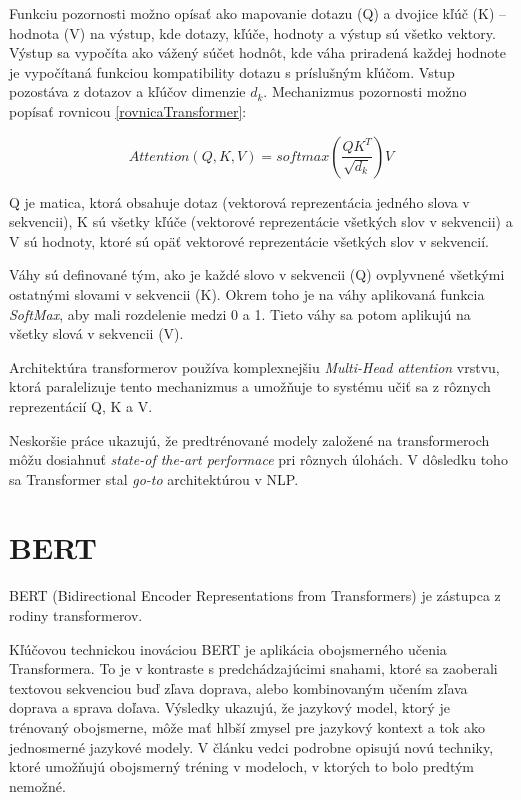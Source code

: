 Funkciu pozornosti možno opísať ako mapovanie dotazu (Q) a dvojice kľúč (K) – hodnota (V) na výstup, kde dotazy, kľúče, hodnoty a výstup sú všetko vektory. Výstup sa vypočíta ako vážený súčet hodnôt, kde váha priradená každej hodnote je vypočítaná funkciou kompatibility dotazu s príslušným kľúčom. Vstup pozostáva z dotazov a kľúčov dimenzie \(d_{k}\).
Mechanizmus pozornosti možno popísať rovnicou \eqref{rovnicaTransformer}: 

\begin{equation}
	Attention(Q, K, V)=  softmax(\dfrac{QK^{T}}{\sqrt{d_{k}}})V \label{rovnicaTransformer}
\end{equation}

Q je matica, ktorá obsahuje dotaz (vektorová reprezentácia jedného slova v sekvencii), K sú všetky kľúče (vektorové reprezentácie všetkých slov v sekvencii) a V sú hodnoty, ktoré sú opäť vektorové reprezentácie všetkých slov v sekvencií.

Váhy sú definované tým, ako je každé slovo v sekvencii (Q) ovplyvnené všetkými ostatnými slovami v sekvencii (K). Okrem toho je na váhy aplikovaná funkcia \textit{SoftMax}, aby mali rozdelenie medzi 0 a 1. Tieto váhy sa potom aplikujú na všetky slová v sekvencii (V).

Architektúra transformerov používa komplexnejšiu \textit{Multi-Head attention} vrstvu, ktorá paralelizuje tento mechanizmus a umožňuje to systému učiť sa z rôznych reprezentácií Q, K a V. 

Neskoršie práce ukazujú, že predtrénované modely založené na transformeroch môžu dosiahnuť \textit{state-of the-art performace} pri rôznych úlohách. V dôsledku toho sa Transformer stal \textit{go-to} architektúrou v NLP. \cite{Tianyang:2021} \cite{Allard:2019}

\section{BERT} \label{bert}

BERT \cite{Devlin:2018} (Bidirectional Encoder Representations from Transformers) je
zástupca z rodiny transformerov. 

Kľúčovou technickou inováciou BERT je aplikácia obojsmerného učenia Transformera. To je v kontraste s predchádzajúcimi snahami, ktoré sa zaoberali textovou sekvenciou buď zľava doprava, alebo kombinovaným učením zľava doprava a sprava doľava. Výsledky ukazujú, že jazykový model, ktorý je trénovaný obojsmerne, môže mať hlbší zmysel pre jazykový kontext a tok ako jednosmerné jazykové modely. V článku vedci podrobne opisujú novú techniky, ktoré umožňujú obojsmerný tréning v modeloch, v ktorých to bolo predtým nemožné.

